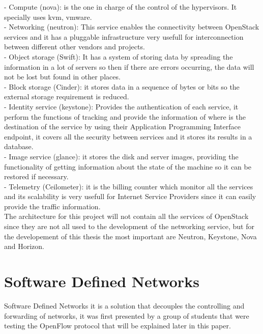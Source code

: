 - Compute (nova): is the one in charge of the control of the hypervisors. It specially uses kvm, vmware.\\

- Networking (neutron): This service enables the connectivity between OpenStack services and it has a pluggable infrastructure very usefull for interconnection between different other vendors and projects.\\

- Object storage (Swift): It has a system of storing data by spreading the information in a lot of servers so then if there are errors occurring, the data will not be lost but found in other places.\\

- Block storage (Cinder): it stores data in a sequence of bytes or bits so the external storage requirement is reduced.\\

- Identity service (keystone): Provides the authentication of each service, it perform the functions of tracking and provide the information of where is the destination of the service by using their Application Programming Interface endpoint, it covers all the security between services and it stores its results in a database. \\

- Image service (glance): it stores the disk and server images, providing the functionality of getting information about the state of the machine so it can be restored if necessary. \\

- Telemetry (Ceilometer): it is the billing counter which monitor all the services and its scalability is very usefull for Internet Service Providers since it can easily provide the traffic information.\\
 
The architecture for this project will not contain all the services of OpenStack since they are not all used to the development of the networking service, but for the developement of this thesis the most important are Neutron, Keystone, Nova and Horizon.\\
 
 
\section{Software Defined Networks}
 
Software Defined Networks it is a solution that decouples the controlling and forwarding of networks, it was first presented by a group of students that were testing the OpenFlow protocol that will be explained later in this paper.\\
 
